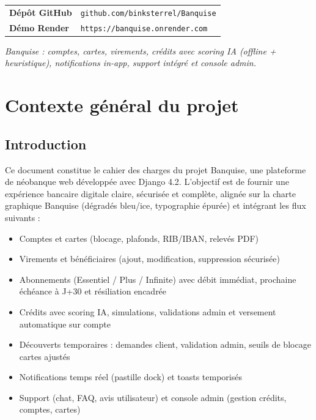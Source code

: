 \documentclass[12pt,a4paper]{report}
\begin{document}
\begin{titlepage}
\begin{center}
    \vspace{0.9cm}

    \begin{tabular}{@{}p{3.6cm}p{10cm}@{}}
        \textbf{Dépôt GitHub} & \texttt{github.com/binksterrel/Banquise} \\
        \textbf{Démo Render} & \texttt{https://banquise.onrender.com} \\
    \end{tabular}

    \vfill
    \textit{Banquise : comptes, cartes, virements, crédits avec scoring IA (offline + heuristique), notifications in-app, support intégré et console admin.}
\end{center}
\end{titlepage}

\newpage
\thispagestyle{empty}
\tableofcontents

\newpage

\chapter{Contexte général du projet}

\section{Introduction}
Ce document constitue le cahier des charges du projet Banquise, une plateforme de néobanque web développée avec Django 4.2. L'objectif est de fournir une expérience bancaire digitale claire, sécurisée et complète, alignée sur la charte graphique Banquise (dégradés bleu/ice, typographie épurée) et intégrant les flux suivants :
\begin{itemize}[leftmargin=1.3cm]
    \item Comptes et cartes (blocage, plafonds, RIB/IBAN, relevés PDF)
    \item Virements et bénéficiaires (ajout, modification, suppression sécurisée)
    \item Abonnements (Essentiel / Plus / Infinite) avec débit immédiat, prochaine échéance à J+30 et résiliation encadrée
    \item Crédits avec scoring IA, simulations, validations admin et versement automatique sur compte
    \item Découverts temporaires : demandes client, validation admin, seuils de blocage cartes ajustés
    \item Notifications temps réel (pastille dock) et toasts temporisés
    \item Support (chat, FAQ, avis utilisateur) et console admin (gestion crédits, comptes, cartes)
\end{itemize}
\end{document}
